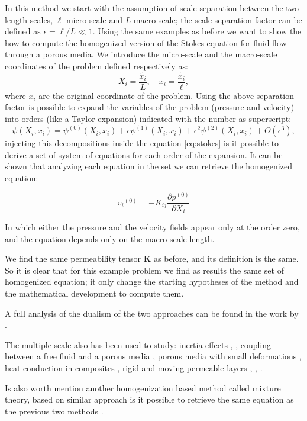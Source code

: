 In this method we start with the assumption of scale separation between the two length scales, $\ell$ micro-scale and $L$ macro-scale; the scale separation factor can be defined as $\epsilon = \ell/L \ll 1$.
Using the same examples as before we want to show the how to compute the homogenized version of the Stokes equation for fluid flow through a porous media.
We introduce the micro-scale and the macro-scale coordinates of the problem defined respectively as:
$$
 X_i = \dfrac{\tilde{x_i}}{L}, \quad   x_i = \dfrac{\tilde{x_i}}{\ell},
$$
where $x_i$ are the original coordinate of the problem.
Using the above separation factor is possible to expand the variables of the problem (pressure and velocity) into orders (like a Taylor expansion) indicated with the number as superscript:
$$
\psi(X_i, x_i) = \psi^{(0)}(X_i, x_i)  +\epsilon \psi^{(1)}(X_i, x_i) +\epsilon^2 \psi^{(2)}(X_i, x_i) +O(\epsilon^3),
$$
injecting this decompositions inside the equation \eqref{eq:stokes} is it possible to derive a set of system of equations for each order of the expansion.
It can be shown that analyzing each equation in the set we can retrieve the homogenized equation:

\begin{equation}
{v_i}^{(0)} = -K_{ij} \dfrac{\partial p^{(0)}}{\partial X_i}
\label{eq:darcy_ms}
\end{equation} 

In which either the pressure and the velocity fields appear only at the order zero, and the equation depends only on the macro-scale length.

We find the same permeability tensor $\mathbf{K}$ as before, and its definition is the same.
So it is clear that for this example problem we find as results the same set of homogenized equation; it only change the starting hypotheses of the method and the mathematical development to compute them.

A full analysis of the dualism of the two approaches can be found in the work by \cite{davit2013homogenization}.

The multiple scale also has been used to study: inertia effects \citet{mei1991effect}, \cite{skjetne1999new}, coupling between a free fluid and a porous media \citet{mikelic2000interface}, porous media with small deformations \citet{auriault1977etude}, heat conduction in composites \citet{auriault1983effective}, rigid and moving permeable layers \citet{zampogna2016fluid}, \citet{ugis}, \citet{zampogna2017pelskin}.

Is also worth mention another homogenization based method called mixture theory, based on similar approach is it possible to retrieve the same equation as the previous two methods \citet{rajagopal2007hierarchy}.




